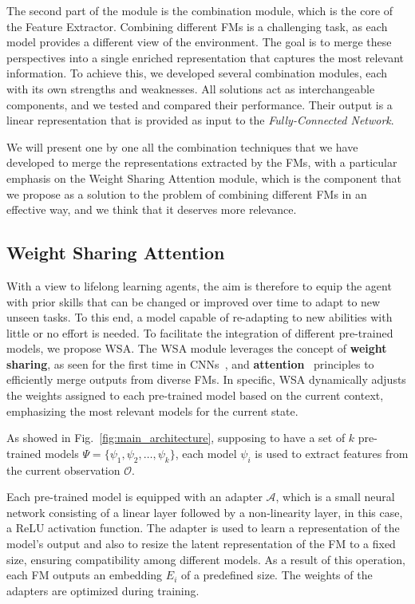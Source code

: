The second part of the module is the combination module, which is the core of the Feature Extractor.
Combining different FMs is a challenging task, as each model provides a different view of the environment.
The goal is to merge these perspectives into a single enriched representation that captures the most relevant information.
To achieve this, we developed several combination modules, each with its own strengths and weaknesses.
All solutions act as interchangeable components, and we tested and compared their performance.
Their output is a linear representation that is provided as input to the \textit{Fully-Connected Network}.


We will present one by one all the combination techniques that we have developed to merge the representations extracted by the FMs, with a particular emphasis on the Weight Sharing Attention module, which is the component that we propose as a solution to the problem of combining different FMs in an effective way, and we think that it deserves more relevance.


\subsection{Weight Sharing Attention}
\label{sec:wsa}

With a view to lifelong learning agents, the aim is therefore to equip the agent with prior skills that can be changed or improved over time to adapt to new unseen tasks.
To this end, a model capable of re-adapting to new abilities with little or no effort is needed.
To facilitate the integration of different pre-trained models, we propose WSA\@.
The WSA module leverages the concept of \textbf{weight sharing}, as seen for the first time in CNNs~\citep{fukushima1980neocognitron}, and \textbf{attention}~\citep{vaswani2017attention} principles to efficiently merge outputs from diverse FMs.
In specific, WSA dynamically adjusts the weights assigned to each pre-trained model based on the current context, emphasizing the most relevant models for the current state.

As showed in Fig.~\ref{fig:main_architecture}, supposing to have a set of $k$ pre-trained models $\Psi = \{\psi_1, \psi_2, \ldots, \psi_k\}$, each model $\psi_i$ is used to extract features from the current observation $\mathcal{O}$.





Each pre-trained model is equipped with an adapter $\mathcal{A}$, which is a small neural network consisting of a linear layer followed by a non-linearity layer, in this case, a ReLU activation function.
The adapter is used to learn a representation of the model's output and also to resize the latent representation of the FM to a fixed size, ensuring compatibility among different models.
As a result of this operation, each FM outputs an embedding $E_i$ of a predefined size.
The weights of the adapters are optimized during training.

